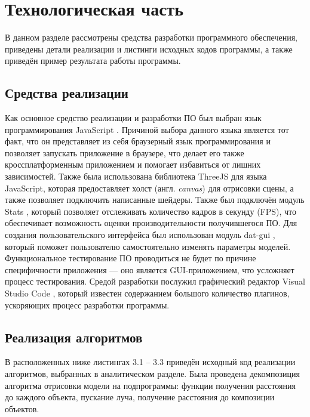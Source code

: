 \section{Технологическая часть}

В  данном  разделе  рассмотрены  средства  разработки  программного 
обеспечения, приведены детали реализации и листинги исходных кодов 
программы, а также приведён пример результата работы программы.

\subsection{Средства реализации}
Как  основное  средство  реализации  и  разработки  ПО  был  выбран  язык 
программирования  JavaScript \cite{js}.
Причиной  выбора  данного  языка  является  тот факт,  что  он  представляет из себя браузерный язык  программирования  и  позволяет запускать приложение в браузере, что делает его также кроссплатформенным приложением  и  помогает  избавиться  от  лишних  зависимостей. 
Также  была использована библиотека ThreeJS \cite{threejs} для языка JavaScript, которая предоставляет холст  (англ.  \textit{canvas})  для  отрисовки  сцены,  а  также  позволяет  подключить написанные шейдеры.
Также был подключён модуль Stats \cite{stats}, который позволяет 
отслеживать  количество  кадров  в  секунду  (FPS),  что  обеспечивает возможность оценки 
производительности  получившегося  ПО.
Для  создания  пользовательского интерфейса  был  использован  модуль  dat-gui \cite{datgui},  который  поможет  пользователю 
самостоятельно  изменять  параметры  моделей.
Функциональное  тестирование ПО  проводиться  не  будет  по  причине  специфичности  приложения  --- оно является  GUI-приложением,  что  усложняет  процесс  тестирования.
Средой разработки  послужил  графический  редактор  Visual  Studio  Code \cite{vscode},  который 
известен  содержанием  большого  количество  плагинов,  ускоряющих  процесс 
разработки  программы.


\subsection{Реализация алгоритмов}

В  расположенных  ниже  листингах  3.1  --  3.3  приведён  исходный  код 
реализации алгоритмов, выбранных в аналитическом разделе.
Была проведена декомпозиция  алгоритма  отрисовки  модели  на  подпрограммы:  функции 
получения расстояния до каждого объекта, пускание луча, получение расстояния 
до композиции объектов.

